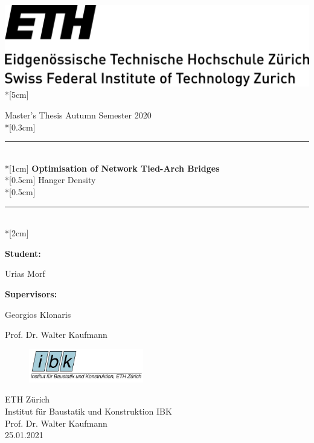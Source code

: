 \thispagestyle{empty}
\begin{flushleft}
      \includegraphics[scale=0.03]{Pictures/eth_logo_lang_pos.jpg} \\*[5cm]
\end{flushleft}

\begin{center}
    {\huge\rm Master's Thesis Autumn Semester 2020} \\*[0.3cm]
    \rule{\textwidth}{3pt}\vspace*{-\baselineskip}\vspace*{2pt}\\*[1cm] 	%
    {\huge\rm \textbf{Optimisation of Network Tied-Arch Bridges }}\\*[0.5cm]
    {\huge\rm Hanger Density}\\*[0.5cm]	
    \rule{\textwidth}{3pt}\vspace*{-\baselineskip}\vspace*{2pt}\\*[2cm] 	%
\end{center}

\textbf{Student:} 

Urias Morf
\vspace*{1cm}

\textbf{Supervisors:}

Georgios Klonaris

Prof. Dr. Walter Kaufmann

\vspace*{5cm}

\begin{figure}
\vspace{-5pt}
\hfill\includegraphics[width=5cm]{Pictures/IBK-Logo.jpg}
\end{figure}
    
\rm ETH Zürich\\
\rm Institut für Baustatik und Konstruktion IBK\\
\rm Prof. Dr. Walter Kaufmann\\
\rm 25.01.2021